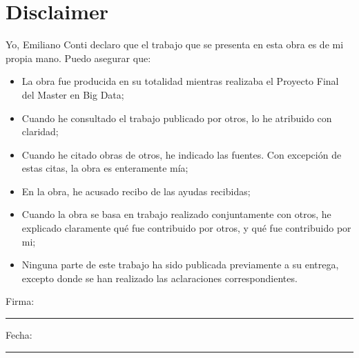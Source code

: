 \chapter*{Disclaimer}
\noindent Yo, Emiliano Conti declaro que el trabajo que se presenta en esta obra es de mi propia mano. Puedo asegurar que:

\begin{itemize}
    \item La obra fue producida en su totalidad mientras realizaba el Proyecto Final del Master en Big Data;
    \item Cuando he consultado el trabajo publicado por otros, lo he atribuido con claridad;
    \item Cuando he citado obras de otros, he indicado las fuentes. Con excepci\'on de estas citas, la obra es enteramente m\'ia;
    \item En la obra, he acusado recibo de las ayudas recibidas;
    \item Cuando la obra se basa en trabajo realizado conjuntamente con otros, he explicado claramente qu\'e fue contribuido por otros, y qu\'e fue contribuido por mi;
    \item Ninguna parte de este trabajo ha sido publicada previamente a su entrega, excepto donde se han realizado las aclaraciones correspondientes.
\end{itemize}

\vspace{2cm}

\noindent Firma: \rule{5cm}{0.1pt}

\vspace{1cm}

\noindent Fecha: \rule{5cm}{0.1pt}